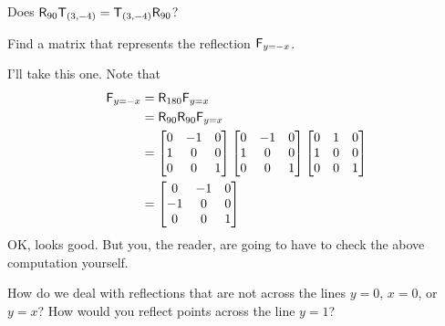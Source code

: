 \documentclass{ximera}
\begin{document}
\begin{question}
Does $\mathsf{R}_{90}\mathsf{T}_{(3,-4)}= \mathsf{T}_{(3,-4)}\mathsf{R}_{90}$?
\end{question}


\begin{question} Find a matrix that represents the reflection $\mathsf{F}_{y=-x}$.
\end{question}

I'll take this one. Note that 
\begin{align*}
\mathsf{F}_{y=-x} &= \mathsf{R}_{180} \mathsf{F}_{y=x} \\
&= \mathsf{R}_{90}\mathsf{R}_{90} \mathsf{F}_{y=x}\\
&= \begin{bmatrix}
0 & -1 & 0\\
1 & 0 & 0\\
0 & 0 & 1
\end{bmatrix}
\begin{bmatrix}
0 & -1 & 0\\
1 & 0 & 0\\
0 & 0 & 1
\end{bmatrix}
\begin{bmatrix}
0&  1 & 0\\
1 & 0 & 0\\
0 &  0 & 1
\end{bmatrix} \\
&=\begin{bmatrix}
0 &  -1 & 0\\
-1 & 0 & 0\\
0 &  0 & 1
\end{bmatrix} 
\end{align*}
OK, looks good.  But you, the reader, are going to have to check the
above computation yourself.



\begin{question} 
How do we deal with reflections that are not across the lines $y=0$,
$x=0$, or $y=x$? How would you reflect points across the line $y = 1$?
\end{question}
\end{document}
